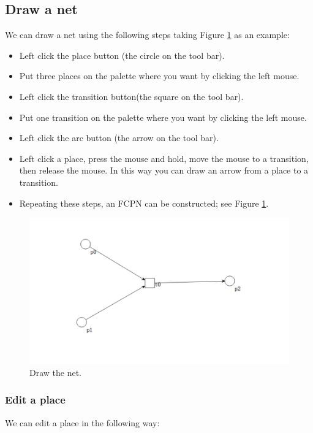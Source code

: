 \documentclass[journal,a4paper,onecolumn]{article}
\begin{document}
\subsection{Draw a net}
We can draw a net using the following steps taking Figure \ref{fig:drawnet} as an example: 

\begin{itemize}
	\item Left click the place button (the circle on the tool bar).
	\item Put three places on the palette where you want by clicking the left mouse.
	\item Left click the transition button(the square on the tool bar).
	\item Put one transition on the palette where you want by clicking the left mouse.
	\item Left click the arc button (the arrow on the tool bar).
	\item Left click a place, press the mouse and hold, move the mouse to a transition, then release the mouse. In this way you can draw an arrow from a place to a transition.
	\item Repeating these steps, an FCPN can be constructed; see Figure \ref{fig:drawnet}.
\end{itemize}


\begin{figure}[!hbt]
	\begin{center}
		\includegraphics[width=\columnwidth]{fig2}
		\caption{Draw the net.}
		\label{fig:drawnet}
	\end{center}
\end{figure}


\subsubsection{Edit a place}
We can edit a place in the following way:
\end{document}
